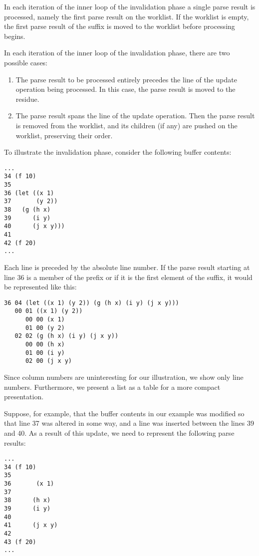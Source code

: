 In each iteration of the inner loop of the invalidation phase a single
parse result is processed, namely the first parse result on the
worklist.  If the worklist is empty, the first parse result of the
suffix is moved to the worklist before processing begins.

In each iteration of the inner loop of the invalidation phase, there
are two possible cases:

\begin{enumerate}
\item The parse result to be processed entirely precedes the line of
  the update operation being processed.  In this case, the parse
  result is moved to the residue.
\item The parse result spans the line of the update operation.  Then
  the parse result is removed from the worklist, and its children (if
  any) are pushed on the worklist, preserving their order.
\end{enumerate}

To illustrate the invalidation phase, consider the following buffer
contents:

{\small\begin{verbatim}
...
34 (f 10)
35
36 (let ((x 1)
37       (y 2))
38   (g (h x)
39      (i y)
40      (j x y)))
41
42 (f 20)
...
\end{verbatim}}

Each line is preceded by the absolute line number.  If the parse
result starting at line 36 is a member of the prefix or if it is the
first element of the suffix, it would be represented like this:

{\small\begin{verbatim}
36 04 (let ((x 1) (y 2)) (g (h x) (i y) (j x y)))
   00 01 ((x 1) (y 2))
      00 00 (x 1)
      01 00 (y 2)
   02 02 (g (h x) (i y) (j x y))
      00 00 (h x)
      01 00 (i y)
      02 00 (j x y)
\end{verbatim}}

Since column numbers are uninteresting for our illustration, we
show only line numbers.  Furthermore, we present a list as a table for
a more compact presentation.

Suppose, for example, that the buffer contents in our example was
modified so that line 37 was altered in some way, and a line was
inserted between the lines 39 and 40.  As a result of this update, we
need to represent the following parse results:

{\small\begin{verbatim}
...
34 (f 10)
35
36       (x 1)
37
38      (h x)
39      (i y)
40
41      (j x y)
42
43 (f 20)
...
\end{verbatim}}

